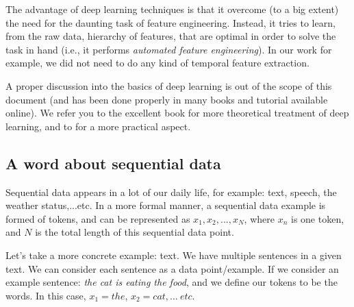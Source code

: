 The advantage of deep learning techniques is that it overcome (to a big extent) the need for the daunting task of feature engineering. Instead, it tries to learn, from the raw data, hierarchy of features, that are optimal in order to solve the task in hand (i.e., it performs \textit{automated feature engineering}). In our work for example, we did not need to do any kind of temporal feature extraction.

\par A proper discussion into the basics of deep learning is out of the scope of this document (and has been done properly in many books and tutorial available online). We refer you to the excellent book \citep{Goodfellow-et-al-2016} for more theoretical treatment of deep learning, and to \citep{chollet2017book,geron2017hands} for a more practical aspect.

\subsection{A word about sequential data} \label{sec:seq_data}
\par Sequential data appears in a lot of our daily life, for example: text, speech, the weather status,...etc. In a more formal manner, a sequential data example is formed of tokens, and can be represented as $x_1, x_2, ..., x_N$, where $x_n$ is one token, and $N$ is the total length of this sequential data point.

\par Let's take a more concrete example: text. We have multiple sentences in a given text. We can consider each sentence as a data point/example. If we consider an example sentence: \textit{the cat is eating the food}, and we define our tokens to be the words. In this case, $x_1=the$, $x_2=cat, \dots\ etc$.

